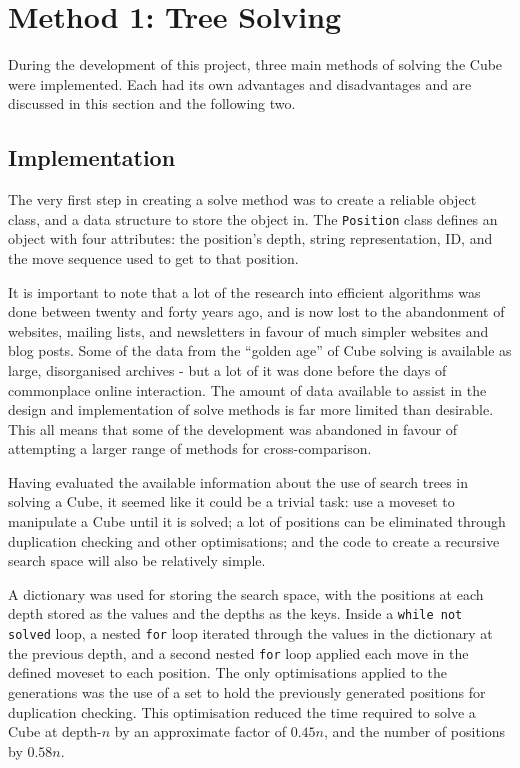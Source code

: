 \documentclass{report}
\newcommand{\depth}[1]{depth-#1}
\newenvironment{aside}{\begin{mdframed}[style=0,%
		leftline=false,rightline=false,leftmargin=2em,rightmargin=2em,%
		innerleftmargin=0pt,innerrightmargin=0pt,linewidth=0.75pt,%
		skipabove=7pt,skipbelow=7pt]\small}
	{\end{mdframed}}
\begin{document}
    \section{Method 1: Tree Solving} \label{sec:treeSolving}
    
    During the development of this project, three main methods of solving the Cube were implemented. Each had its own advantages and disadvantages and are discussed in this section and the following two.
    
    \subsection{Implementation} \label{sec:treeSolveImplementation}
    
    The very first step in creating a solve method was to create a reliable object class, and a data structure to store the object in. The \lstinline|Position| class defines an object with four attributes: the position's depth, string representation, ID, and the move sequence used to get to that position.
    
   	\begin{aside}
   		    It is important to note that a lot of the research into efficient algorithms was done between twenty and forty years ago, and is now lost to the abandonment of websites, mailing lists, and newsletters in favour of much simpler websites and blog posts. Some of the data from the \enquote{golden age} of Cube solving is available as large, disorganised archives - but a lot of it was done before the days of commonplace online interaction. The amount of data available to assist in the design and implementation of solve methods is far more limited than desirable. This all means that some of the development was abandoned in favour of attempting a larger range of methods for cross-comparison.
   	\end{aside}

    Having evaluated the available information about the use of search trees in solving a Cube, it seemed like it could be a trivial task: use a moveset to manipulate a Cube until it is solved; a lot of positions can be eliminated through duplication checking and other optimisations; and the code to create a recursive search space will also be relatively simple. 
    
    A dictionary was used for storing the search space, with the positions at each depth stored as the values and the depths as the keys. Inside a \lstinline|while not solved| loop, a nested \lstinline|for| loop iterated through the values in the dictionary at the previous depth, and a second nested \lstinline|for| loop applied each move in the defined moveset to each position. The only optimisations applied to the generations was the use of a set to hold the previously generated positions for duplication checking. This optimisation reduced the time required to solve a Cube at \depth{$n$} by an approximate factor of $0.45n$, and the number of positions by $0.58n$.
    
\end{document}
